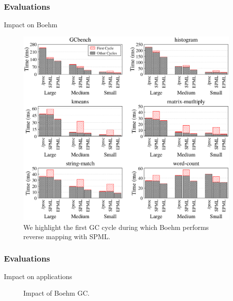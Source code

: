 \documentclass[xcolor=table,bigger,unknownkeysallowed]{beamer}
\begin{document}
        \begin{frame}
                \frametitle{Evaluations}
				\begin{block}{Impact on Boehm}
\begin{figure}[!h]
	\centering 
\includegraphics[width=.45\linewidth]{fig/boehm-results-tracker}

%		
		
	\caption{\scriptsize We highlight the first GC cycle during which Boehm performs reverse mapping with SPML.}
	\label{fig:boehm-results-tracker}
\end{figure}											
			\end{block}
        \end{frame}
        \begin{frame}
                \frametitle{Evaluations}
				\begin{block}{Impact on applications}
\begin{figure}[!htp]
	\centering 
{}		
	\caption{\small Impact of Boehm GC.}
	\label{fig:boehm-results-tracked}
\end{figure}											
			\end{block}
        \end{frame}      
\end{document}

